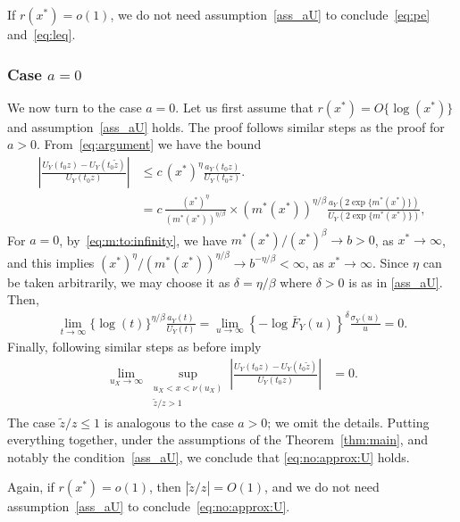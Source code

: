 \documentclass{statsoc}
\theoremstyle{break}
\newcommand{\tzero}{t_0}
\begin{document}
If $r(x^*) = o(1)$, we do not need assumption~\eqref{ass_aU} to conclude~\eqref{eq:pe} and~\eqref{eq:leq}.

 
\subsubsection*{Case $a  = 0$}  
We now turn to the case $a=0$.  Let us first assume that $r(x^*) = O\{\log(x^*)\}$ and assumption~\eqref{ass_aU} holds.
The proof follows similar steps as the proof for $a >0 $.
From~\eqref{eq:argument} we have the bound 
\begin{align}\label{eq:argument:2}
	\left|  \frac{U_Y(\tzero z) - U_Y(\tzero \tilde z)}{ U_Y(\tzero z)} \right| 
	& \leq   c\, (x^*)^\eta   \frac{a_Y(t_0 z)}{U_Y(\tzero z)}. \nonumber \\
	& =  c\, \frac{(x^*)^\eta}{ (m^*(x^*))^{\eta/\beta}}  \times (m^*(x^*))^{\eta/\beta}\frac{a_Y(2\exp\{m^*(x^*)\})}{U_Y(2\exp\{m^*(x^*)\})}, 
\end{align}
For $a = 0$, by~\eqref{eq:m:to:infinity}, we have $m^*(x^*)/(x^*)^\beta \to b > 0 $, as $x^* \to \infty$, and this implies $(x^*)^{\eta} / (m^*(x^*))^{\eta/\beta}  \to b^{-\eta/\beta} < \infty$, as $x^* \to \infty$. 
Since $\eta$ can be taken arbitrarily, we may choose it as $\delta = \eta/\beta $ where $\delta > 0$ is as in \eqref{ass_aU}. Then, 
\begin{align*}
	\lim_{t \to \infty } \{ \log(t)\}^{\eta/\beta} \frac{a_Y(t)}{U_Y(t)} = \lim_{u \to \infty} \left\{ -\log  \bar F_Y(u) \right\}^{\delta} \frac{\sigma_Y(u)}{ u } = 0. 
\end{align*}
Finally, following similar steps as before imply 
\begin{align*}
	\lim_{u_X \to \infty} \sup_{  \substack{ u_{X} < x  < \nu(u_X) \\
			\tilde z/z > 1
	} }   \left|  \frac{U_Y(\tzero z) - U_Y(\tzero \tilde z)}{ U_Y(\tzero z)} \right|  
	&= 0 .
\end{align*}
The case $\tilde z/z \leq 1$ is analogous to the case $a > 0$; we omit the details. Putting everything together, under the assumptions of the Theorem~\ref{thm:main}, and notably the condition~\eqref{ass_aU}, we conclude that \eqref{eq:no:approx:U} holds.

Again, if $r(x^*) = o(1)$, then $|\tilde z/z| = O(1)$, and we do not need assumption~\eqref{ass_aU} to conclude~\eqref{eq:no:approx:U}.
\end{document}
